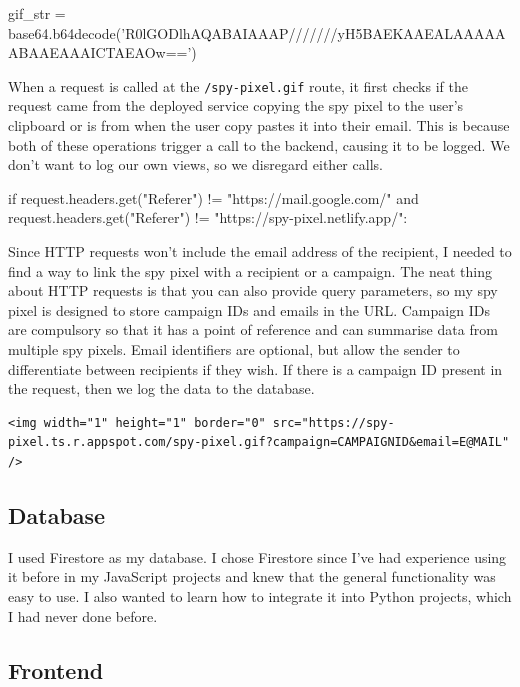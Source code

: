 \documentclass{article}
\begin{document}
\begin{python}
gif_str = base64.b64decode('R0lGODlhAQABAIAAAP///////yH5BAEKAAEALAAAAAABAAEAAAICTAEAOw==')
\end{python}

When a request is called at the \texttt{/spy-pixel.gif} route, it first checks if the request came from the deployed service copying the spy pixel to the user's clipboard or is from when the user copy pastes it into their email. This is because both of these operations trigger a call to the backend, causing it to be logged. We don't want to log our own views, so we disregard either calls.

\begin{python}
if request.headers.get("Referer") != "https://mail.google.com/" and request.headers.get("Referer") != "https://spy-pixel.netlify.app/":
\end{python}

Since HTTP requests won't include the email address of the recipient, I needed to find a way to link the spy pixel with a recipient or a campaign. The neat thing about HTTP requests is that you can also provide query parameters, so my spy pixel is designed to store campaign IDs and emails in the URL. Campaign IDs are compulsory so that it has a point of reference and can summarise data from multiple spy pixels. Email identifiers are optional, but allow the sender to differentiate between recipients if they wish. If there is a campaign ID present in the request, then we log the data to the database.

\begin{lstlisting}
<img width="1" height="1" border="0" src="https://spy-pixel.ts.r.appspot.com/spy-pixel.gif?campaign=CAMPAIGNID&email=E@MAIL" />
\end{lstlisting}

\subsection{Database}

I used Firestore as my database. I chose Firestore since I've had experience using it before in my JavaScript projects and knew that the general functionality was easy to use. I also wanted to learn how to integrate it into Python projects, which I had never done before.

\subsection{Frontend}
\end{document}
